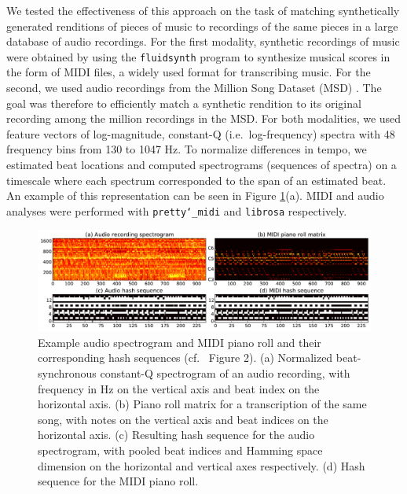 \documentclass{article} %
\begin{document}
We tested the effectiveness of this approach on the task of matching synthetically generated renditions of pieces of music to recordings of the same pieces in a large database of audio recordings.
For the first modality, synthetic recordings of music were obtained by using the \texttt{fluidsynth} program to synthesize musical scores in the form of MIDI files, a widely used format for transcribing music.
For the second, we used audio recordings from the Million Song Dataset (MSD) \cite{bertin2011million,schindler2012facilitating}.
The goal was therefore to efficiently match a synthetic rendition to its original recording among the million recordings in the MSD.
For both modalities, we used feature vectors of log-magnitude, constant-Q (i.e.\ log-frequency) spectra with 48 frequency bins from 130 to 1047 Hz.
To normalize differences in tempo, we estimated beat locations and computed spectrograms (sequences of spectra) on a timescale where each spectrum corresponded to the span of an estimated beat.
An example of this representation can be seen in Figure \ref{fig:sims_and_dtws}(a).
MIDI and audio analyses were performed with \texttt{pretty\char`_midi} \cite{raffel2014pretty_midi} and \texttt{librosa} \cite{mcfee2015librosa,mcfee2015librosa_scipy} respectively.

\begin{figure}
  \centering
  \includegraphics[width=\textwidth]{sims_and_dtws.pdf}
  \caption{Example audio spectrogram and MIDI piano roll and their corresponding hash sequences (cf.\ \cite{raffel2015large} Figure 2).
  (a) Normalized beat-synchronous constant-Q spectrogram of an audio recording, with frequency in Hz on the vertical axis and beat index on the horizontal axis.
  (b) Piano roll matrix for a transcription of the same song, with notes on the vertical axis and beat indices on the horizontal axis.
  (c) Resulting hash sequence for the audio spectrogram, with pooled beat indices and Hamming space dimension on the horizontal and vertical axes respectively.
  (d) Hash sequence for the MIDI piano roll.}
  \label{fig:sims_and_dtws}
\end{figure}
\end{document}
